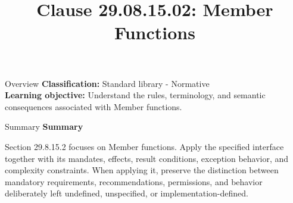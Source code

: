 \documentclass[10pt,letterpaper]{article}
\title{Clause 29.08.15.02: Member Functions}
\author{}
\date{}
\begin{document}
\maketitle
\begin{CornellOverviewBox}{Overview}
\textbf{Classification:} Standard library - Normative\\[2pt]
\textbf{Learning objective:} Understand the rules, terminology, and semantic consequences associated with Member functions.
\end{CornellOverviewBox}\begin{CornellSummaryBox}{Summary}
{\sffamily\bfseries\color{Accent} Summary}\par\vspace{3pt}Section 29.8.15.2 focuses on Member functions. Apply the specified interface together with its mandates, effects, result conditions, exception behavior, and complexity constraints. When applying it, preserve the distinction between mandatory requirements, recommendations, permissions, and behavior deliberately left undefined, unspecified, or implementation-defined.
\end{CornellSummaryBox}
\end{document}
